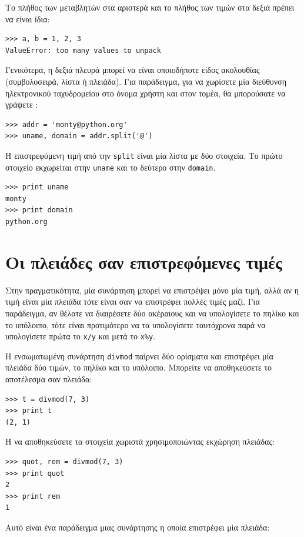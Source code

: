 \documentclass[10pt]{book}
\begin{document}
Το πλήθος των μεταβλητών στα αριστερά και το πλήθος των τιμών στα δεξιά πρέπει να είναι ίδια:

\begin{verbatim}
>>> a, b = 1, 2, 3
ValueError: too many values to unpack
\end{verbatim}
%
Γενικότερα, η δεξιά πλευρά μπορεί να είναι οποιοδήποτε είδος ακολουθίας (συμβολοσειρά, λίστα ή πλειάδα). Για παράδειγμα, για να χωρίσετε μία διεύθυνση ηλεκτρονικού ταχυδρομείου στο όνομα χρήστη και στον τομέα, θα μπορούσατε να γράψετε : 

\begin{verbatim}
>>> addr = 'monty@python.org'
>>> uname, domain = addr.split('@')
\end{verbatim}
%
Η επιστρεφόμενη τιμή από την {\tt split} είναι μία λίστα με δύο στοιχεία. Το πρώτο στοιχείο εκχωρείται στην {\tt uname} και το δεύτερο στην {\tt domain}.

\begin{verbatim}
>>> print uname
monty
>>> print domain
python.org
\end{verbatim}
%

 
\section{Οι πλειάδες σαν επιστρεφόμενες τιμές}

Στην πραγματικότητα, μία συνάρτηση μπορεί να επιστρέψει μόνο μία τιμή, αλλά αν η τιμή είναι μία πλειάδα τότε είναι σαν να επιστρέφει πολλές τιμές μαζί. Για παράδειγμα, αν θέλατε να διαιρέσετε δύο ακέραιους και να υπολογίσετε το πηλίκο και το υπόλοιπο, τότε είναι προτιμότερο να τα υπολογίσετε ταυτόχρονα παρά να υπολογίσετε πρώτα το {\tt x/y} και μετά το {\tt x\%y}.

Η ενσωματωμένη συνάρτηση {\tt divmod} παίρνει δύο ορίσματα και επιστρέφει μία πλειάδα δύο τιμών, το πηλίκο και το υπόλοιπο. Μπορείτε να αποθηκεύσετε το αποτέλεσμα σαν πλειάδα:

\begin{verbatim}
>>> t = divmod(7, 3)
>>> print t
(2, 1)
\end{verbatim}
%
Ή να αποθηκεύσετε τα στοιχεία χωριστά χρησιμοποιώντας εκχώρηση πλειάδας:

\begin{verbatim}
>>> quot, rem = divmod(7, 3)
>>> print quot
2
>>> print rem
1
\end{verbatim}
%
Αυτό είναι ένα παράδειγμα μιας συνάρτησης η οποία επιστρέφει μία πλειάδα:
\end{document}
